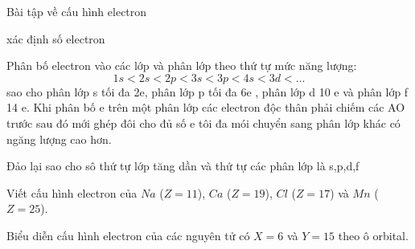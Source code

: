 \documentclass[Main.tex]{subfiles}
\begin{document}
\begin{dang}{Bài tập về cấu hình electron}\end{dang}
\begin{pp}
	\begin{cacbuoc}
		\item xác định số electron
		\item Phân bố electron vào các lớp và phân lớp theo thứ tự mức năng lượng:
		\[1s<2s<2p<3s<3p<4s<3d<...\] sao cho phân lớp s tối đa 2e, phân lớp p tối đa 6e , phân lớp d 10 e và phân lớp f 14 e. Khi phân bố e trên một phân lớp các electron độc thân phải chiếm các AO trước sau đó mới ghép đôi cho đủ số e tôi đa mói chuyển sang phân lớp khác có ngăng lượng cao hơn.
		\item Đảo lại  sao cho sô thứ tự lớp tăng dần và thứ tự các phân lớp là s,p,d,f
	\end{cacbuoc}
\end{pp}
\hienthiloigiaivd
\begin{vdex}
	Viết cấu hình electron của $Na$ ($Z=11$), $Ca$ ($Z=19$), $Cl$ ($Z=17$) và $Mn$ ($Z=25$).
\end{vdex}
\begin{vdex}
	Biểu diễn cấu hình electron của các nguyên tử có $X=6$ và $Y=15$ theo ô orbital.
\end{vdex}
\end{document}
